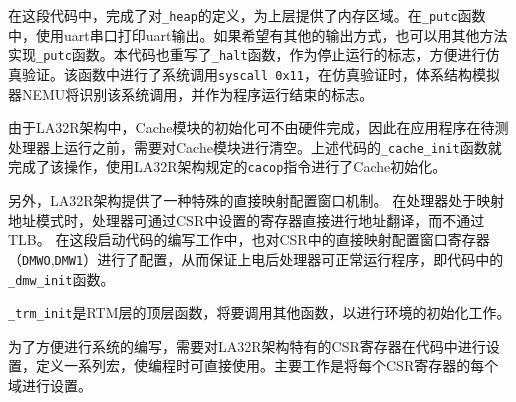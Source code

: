 在这段代码中，完成了对\texttt{\_heap}的定义，为上层提供了内存区域。在\texttt{\_putc}函数中，使用uart串口打印uart输出。如果希望有其他的输出方式，也可以用其他方法实现\texttt{\_putc}函数。本代码也重写了\texttt{\_halt}函数，作为停止运行的标志，方便进行仿真验证。该函数中进行了系统调用\texttt{syscall\ 0x11}，在仿真验证时，体系结构模拟器NEMU将识别该系统调用，并作为程序运行结束的标志。

由于LA32R架构中，Cache模块的初始化可不由硬件完成，因此在应用程序在待测处理器上运行之前，需要对Cache模块进行清空。上述代码的\texttt{\_cache\_init}函数就完成了该操作，使用LA32R架构规定的\texttt{cacop}指令进行了Cache初始化。

另外，LA32R架构提供了一种特殊的直接映射配置窗口机制。
在处理器处于映射地址模式时，处理器可通过CSR中设置的寄存器直接进行地址翻译，而不通过TLB。
在这段启动代码的编写工作中，也对CSR中的直接映射配置窗口寄存器（\texttt{DMWO},\texttt{DMW1}）进行了配置，从而保证上电后处理器可正常运行程序，即代码中的\texttt{\_dmw\_init}函数。

\texttt{\_trm\_init}是RTM层的顶层函数，将要调用其他函数，以进行环境的初始化工作。

为了方便进行系统的编写，需要对LA32R架构特有的CSR寄存器在代码中进行设置，定义一系列宏，使编程时可直接使用。主要工作是将每个CSR寄存器的每个域进行设置。

